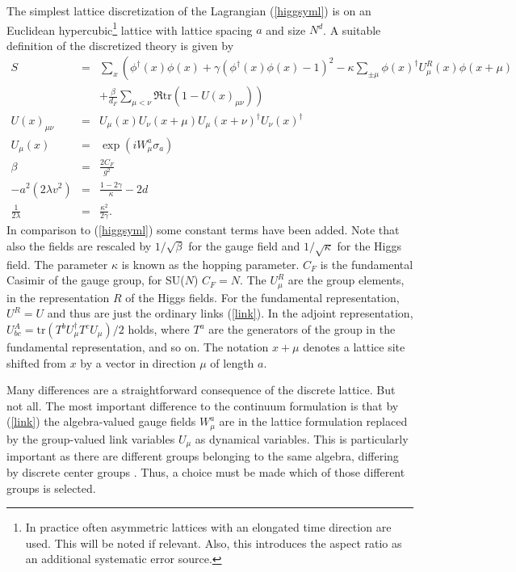 \documentclass[final,12pt]{article}
\newcommand*{\no}{\noindent}
\newcommand*{\bea}{\begin{eqnarray}}
\newcommand*{\eea}{\end{eqnarray}}
\newcommand*{\pref}[1]{(\ref{#1})}
\newcommand*{\mn}{{\mu\nu}}
\newcommand*{\nn}{\nonumber}
\newcommand*{\tr}{\mathrm{tr}}
\newcommand*{\1}{1\!\!\!\bot}
\begin{document}
The simplest lattice discretization of the Lagrangian \pref{higgsyml} is on an Euclidean hypercubic\footnote{In practice often asymmetric lattices with an elongated time direction are used. This will be noted if relevant. Also, this introduces the aspect ratio as an additional systematic error source.} lattice with lattice spacing $a$ and size $N^d$. A suitable definition of the discretized theory is given by \cite{Montvay:1994cy}
\bea
S&=&\sum_x\left(\phi^\dagger(x)\phi(x)+\gamma(\phi^\dagger(x)\phi(x)-1)^2-\kappa\sum_{\pm\mu}\phi(x)^\dagger U^R_\mu(x)\phi(x+\mu)\right.\label{higgsymlat}\\
&&\left.+\frac{\beta}{d_F}\sum_{\mu<\nu}\Re\tr\left(1-U(x)_\mn\right)\right)\nn\\
U(x)_\mn&=&U_\mu(x)U_\nu(x+\mu)U_\mu(x+\nu)^\dagger U_\nu(x)^\dagger\label{plaq}\\
U_\mu(x)&=&\exp(iW_\mu^a\sigma_a)\label{link}\\
\beta&=&\frac{2C_F}{g^2}\label{beta}\\
-a^2(2\lambda v^2)&=&\frac{1-2\gamma}{\kappa}-2d\label{hopping}\\
\frac{1}{2\lambda}&=&\frac{\kappa^2}{2\gamma}\label{lambda}.
\eea
\no In comparison to \pref{higgsyml} some constant terms have been added. Note that also the fields are rescaled by $1/\sqrt{\beta}$ for the gauge field and $1/\sqrt{\kappa}$ for the Higgs field. The parameter $\kappa$ is known as the hopping parameter. $C_F$ is the fundamental Casimir of the gauge group, for SU($N$) $C_F=N$.  The $U_\mu^R$ are the group elements, in the representation $R$ of the Higgs fields. For the fundamental representation, $U^R=U$ and thus are just the ordinary links \pref{link}. In the adjoint representation, $U^A_{bc}=\tr\left(T^b U_\mu^\dagger T^c U_\mu\right)/2$ holds, where $T^a$ are the generators of the group in the fundamental representation, and so on. The notation $x+\mu$ denotes a lattice site shifted from $x$ by a vector in direction $\mu$ of length $a$.

Many differences are a straightforward consequence of the discrete lattice. But not all. The most important difference to the continuum formulation is that by \pref{link} the algebra-valued gauge fields $W_\mu^a$ are in the lattice formulation replaced by the group-valued link variables $U_\mu$ as dynamical variables. This is particularly important as there are different groups belonging to the same algebra, differing by discrete center groups \cite{O'Raifeartaigh:1986vq}. Thus, a choice must be made which of those different groups is selected.
\end{document}
